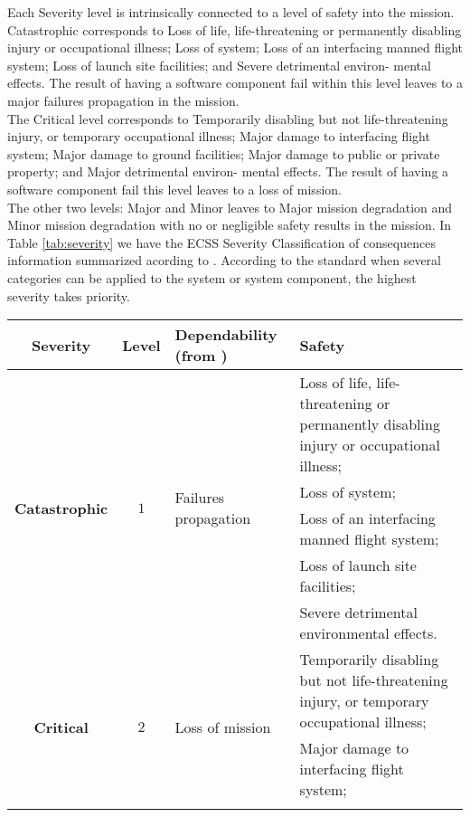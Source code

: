 {Each Severity level is intrinsically connected to a level of safety into the mission. Catastrophic corresponds to
Loss of life, life-threatening or permanently disabling injury or occupational illness; Loss of system; 
Loss of an interfacing manned flight system; Loss of launch site facilities; and Severe detrimental environ- mental effects. The result
of having a software component fail within this level leaves to a major failures propagation in the mission.\\
The Critical level corresponds to Temporarily disabling but not life-threatening injury, or temporary occupational illness;
Major damage to interfacing flight system; Major damage to ground facilities; Major damage to public or private property;
and Major detrimental environ- mental effects. The result of having a software component fail this level leaves to a loss of mission.\\
The other two levels: Major and Minor leaves to Major mission degradation and Minor mission degradation with no or negligible safety results in the mission.
In Table \ref{tab:severity} we have the \ac{ECSS} Severity Classification of consequences information summarized acording to \cite{ecss-q-st-40c}.
According to the standard
when several categories can be applied to the system or system component, the highest severity takes priority.
\begin{table}[!ht]
\centering
\noindent \begin{tabular}{|c|c|m{4cm}|m{5cm}|}\hline
\textbf{Severity} & \textbf{Level} & \textbf{Dependability (from \cite{ecss-q-st-30c})} & \textbf{Safety}\\\hline\hline
\multirow{5}{*}{\textbf{Catastrophic}} & \multirow{5}{*}{$1$} & \multirow{5}{*}{Failures propagation} & 
Loss of life, life-threatening or permanently disabling injury or occupational illness;\\\cline{4-4}
& & & Loss of system;  \\ \cline{4-4}
& & & Loss of an interfacing manned flight system; \\ \cline{4-4}
& & & Loss of launch site facilities;  \\ \cline{4-4}
& & & Severe detrimental environmental effects.  \\\hline\hline
\multirow{5}{*}{\textbf{Critical}} & \multirow{5}{*}{$2$} & \multirow{5}{*}{Loss of mission} & 
Temporarily disabling but not life-threatening injury, or temporary occupational illness;\\\cline{4-4}
& & & Major damage to interfacing flight system;  \\ \cline{4-4}

\end{tabular}
\end{table}}
